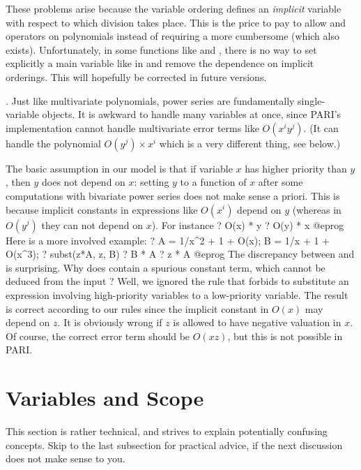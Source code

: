 These problems arise because the variable ordering defines an \emph{implicit}
variable with respect to which division takes place. This is
the price to pay to allow \kbd{\%} and \kbd{/} operators on polynomials
instead of requiring a more cumbersome 
(which also exists). Unfortunately, in some functions like  and
, there is no way to set explicitly a main variable like in
 and remove the dependence on implicit orderings. This will
hopefully be corrected in future versions.

.
Just like multivariate polynomials, power series are fundamentally
single-variable objects. It is awkward to handle many variables at once,
since PARI's implementation cannot handle multivariate error terms like
$O(x^i y^j)$. (It can handle the polynomial $O(y^j) \times x^i$ which is
a very different thing, see below.)

The basic assumption in our model is that if variable $x$ has higher
priority than $y$, then $y$ does not depend on $x$: setting $y$ to a
function of $x$ after some computations with bivariate power series does
not make sense a priori. This is because implicit constants in
expressions like $O(x^i)$ depend on $y$ (whereas in $O(y^j)$ they can not
depend on $x$). For instance
\bprog
  ? O(x) * y
  ? O(y) * x
@eprog\noindent
Here is a more involved example:
\bprog
  ? A = 1/x^2 + 1 + O(x); B = 1/x + 1 + O(x^3);
  ? subst(z*A, z, B)
  ? B * A
  ? z * A
@eprog\noindent
The discrepancy between  and  is surprising. Why does
 contain a spurious constant term, which cannot be
deduced from the input ? Well, we ignored the rule that forbids to
substitute an expression involving high-priority variables
to a low-priority variable. The result  is correct according to
our rules since the implicit constant in $O(x)$ may depend on $z$. It is
obviously wrong if $z$ is allowed to have negative valuation in $x$. Of
course, the correct error term should be $O(xz)$, but this is not
possible in PARI.

\section{Variables and Scope}\label{se:scope}
This section is rather technical, and strives to explain potentially
confusing concepts. Skip to the last subsection for practical advice, if the
next discussion does not make sense to you.

